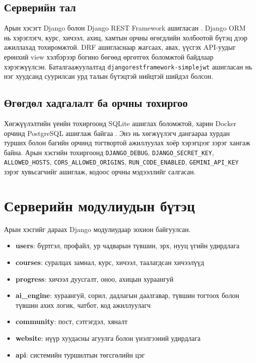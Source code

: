 \subsection{Серверийн тал}
Арын хэсэгт Django болон Django REST Framework ашигласан \cite{django,drf}. Django ORM нь хэрэглэгч, курс, хичээл, ахиц, хамтын орчны өгөгдлийн холбоотой бүтэц дээр ажиллахад тохиромжтой. DRF ашигласнаар жагсаах, авах, үүсгэх API-уудыг ерөнхий view хэлбэрээр богино бөгөөд өргөтгөх боломжтой байдлаар хэрэгжүүлсэн. Баталгаажуулалтад \texttt{djangorestframework-simplejwt} ашигласан нь нэг хуудсанд суурилсан урд талын бүтэцтэй нийцтэй шийдэл болсон.

\subsection{Өгөгдөл хадгалалт ба орчны тохиргоо}
Хөгжүүлэлтийн үеийн тохиргоонд SQLite ашиглах боломжтой, харин Docker орчинд PostgreSQL ашиглаж байгаа \cite{postgres}. Энэ нь хөгжүүлэгч дангаараа хурдан турших болон багийн орчинд тогтвортой ажиллуулах хоёр хэрэгцээг зэрэг хангаж байна. Арын хэсгийн тохиргоонд \texttt{DJANGO\_DEBUG}, \texttt{DJANGO\_SECRET\_KEY}, \texttt{ALLOWED\_HOSTS}, \texttt{CORS\_ALLOWED\_ORIGINS}, \texttt{RUN\_CODE\_ENABLED}, \texttt{GEMINI\_API\_KEY} зэрэг хувьсагчийг ашиглаж, кодоос орчны мэдээллийг салгасан.

\section{Серверийн модулиудын бүтэц}
Арын хэсгийг дараах Django модулиудаар зохион байгуулсан.
\begin{itemize}
\item \textbf{users}: бүртгэл, профайл, ур чадварын түвшин, эрх, нууц үгийн удирдлага
\item \textbf{courses}: суралцах замнал, курс, хичээл, таалагдсан хичээлүүд
\item \textbf{progress}: хичээл дуусгалт, оноо, ахицын хураангуй
\item \textbf{ai\_engine}: хураангуй, сорил, дадлагын даалгавар, түвшин тогтоох болон түвшин ахих логик, чатбот, код ажиллуулагч
\item \textbf{community}: пост, сэтгэгдэл, хяналт
\item \textbf{website}: нүүр хуудасны агуулга болон үнэлгээний удирдлага
\item \textbf{api}: системийн туршилтын төгсгөлийн цэг
\end{itemize}

